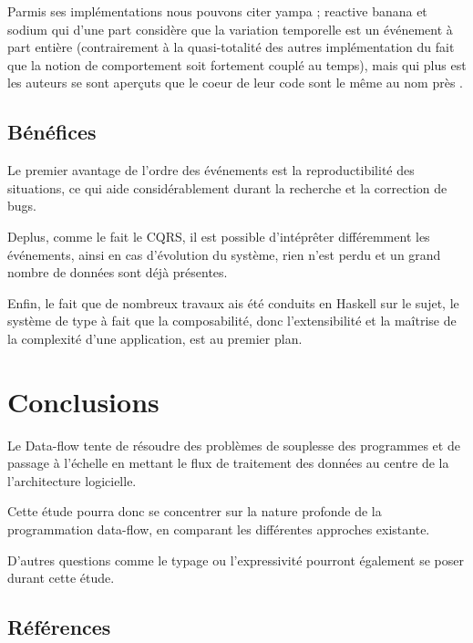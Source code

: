 \documentclass{article}
\begin{document}
Parmis ses implémentations nous pouvons citer yampa \cite{yampa} \cite{arrows};
reactive banana \cite{reactivebanana} et sodium \cite{sodium} qui d'une part considère que
la variation temporelle est un événement à part entière (contrairement à
la quasi-totalité des autres implémentation du fait que la notion de
comportement soit fortement couplé au temps), mais qui plus est les
auteurs se sont aperçuts que le coeur de leur code sont le même au nom
près \cite{sodium_talk}.

\subsection{Bénéfices}\label{bénéfices-1}

Le premier avantage de l'ordre des événements est la reproductibilité
des situations, ce qui aide considérablement durant la recherche et la
correction de bugs.

Deplus, comme le fait le CQRS, il est possible d'intéprêter différemment
les événements, ainsi en cas d'évolution du système, rien n'est perdu et
un grand nombre de données sont déjà présentes.

Enfin, le fait que de nombreux travaux ais été conduits en Haskell sur
le sujet, le système de type à fait que la composabilité, donc
l'extensibilité et la maîtrise de la complexité d'une application, est
au premier plan.

\section{Conclusions}\label{conclusions}

Le Data-flow tente de résoudre des problèmes de souplesse des programmes
et de passage à l'échelle en mettant le flux de traitement des données
au centre de la l'architecture logicielle.

Cette étude pourra donc se concentrer sur la nature profonde de la
programmation data-flow, en comparant les différentes approches
existante.

D'autres questions comme le typage ou l'expressivité pourront également
se poser durant cette étude.


\begin{appendices}
\section{Références}\label{références}


\end{appendices}
\end{document}
